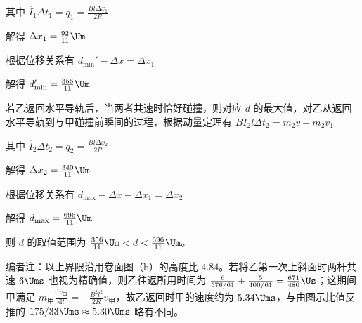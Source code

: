 \documentclass[\gkver]{gaokaozhenti}
\begin{document}
\begin{enumerate}
{其中 $\overline{I}_{1}\Delta t_{1} = q_{1} = \frac{Bl\Delta x_{1}}{2R}$

解得 $\Delta x_{1} = \frac{92}{11} \Um$

根据位移关系有
$d_{\min}' - \Delta x = \Delta x_{1}$

解得 $d_{\min}' = \frac{356}{11} \Um$

若乙返回水平导轨后，当两者共速时恰好碰撞，则对应 $d$ 的最大值，对乙从返回水平导轨到与甲碰撞前瞬间的过程，根据动量定理有
$B\overline{I}_{2}l\Delta t_{2} = m_{2}v + m_{2}v_{1}$

其中 $\overline{I}_{2}\Delta t_{2} = q_{2} = \frac{Bl\Delta x_{2}}{2R}$

解得 $\Delta x_{2} = \frac{340}{11} \Um$

根据位移关系有 $d_{\max} - \Delta x - \Delta x_{1} = \Delta x_{2}$

解得 $d_{\max} = \frac{696}{11} \Um$

则 $d$ 的取值范围为 $\frac{356}{11} \Um < d < \frac{696}{11} \Um$。

编者注：以上界限沿用卷面图（b）的高度比 $4.84$。若将乙第一次上斜面时两杆共速 $6\Ums$ 也视为精确值，则乙往返所用时间为 $\frac{6}{576/61}+\frac{5}{400/61}=\frac{671}{480}\Us$；这期间甲满足 $m_{\text{甲}}\frac{\mathrm{d}v_{\text{甲}}}{\mathrm{d}t}=-\frac{B^2l^2}{2R}v_{\text{甲}}$，故乙返回时甲的速度约为 $5.34\Ums$，与由图示比值反推的 $175/33\Ums\approx5.30\Ums$ 略有不同。
}

\end{enumerate}
\end{document}
